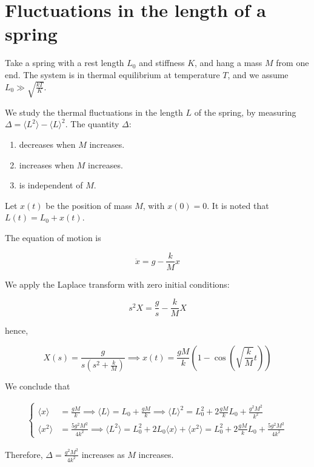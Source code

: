 \documentclass[english]{article}
\begin{document}
	\section{Fluctuations in the length of a spring}
	\begin{tcolorbox}[colback=blue!5!white,colframe=blue!75!black]
		\quad Take a spring with a rest length $L_0$ and stiffness $K$, and hang a mass $M$ from one end. The system is in thermal equilibrium at temperature $T$, and we assume $L_0 \gg \sqrt{\frac{kT}{K}}$.
		
		\quad We study the thermal fluctuations in the length $L$ of the spring, by measuring $\Delta = \langle L^2 \rangle - \langle L \rangle^2$. The quantity $\Delta$:
		\begin{enumerate}
			\item decreases when $M$ increases.
			\item increases when $M$ increases.
			\item is independent of $M$.
		\end{enumerate}
	\end{tcolorbox}

	Let \( x(t) \) be the position of mass \( M \), with \( x(0) = 0 \). It is noted that \( L(t) = L_0 + x(t) \).
	
	The equation of motion is
	
	\[ \ddot{x} = g - \frac{k}{M} x \]
	
	We apply the Laplace transform with zero initial conditions:
	
	\[ s^2 X = \frac{g}{s} - \frac{k}{M}X \]
	
	hence,
	
	$$ X(s) = \frac{g}{s \left(s^2 + \frac{k}{M}\right)} \implies x(t) = \frac{gM}{k}\left( 1 - \cos\left(\sqrt{\frac{k}{M}} t \right) \right)  $$
	
	We conclude that
	
	\begin{align}
	\begin{cases}
	\langle x \rangle &= \frac{gM}{k} \implies \langle L \rangle = L_0 + \frac{gM}{k} \implies \langle L \rangle^2 = L_0^2 + 2\frac{gM}{k}L_0 + \frac{g^2M^2}{k^2} \\
	\langle x^2 \rangle &= \frac{5g^2M^2}{4k^2} \implies \langle L^2 \rangle = L_0^2 + 2L_0\langle x \rangle + \langle x^2 \rangle = L_0^2 + 2\frac{gM}{k}L_0 + \frac{5g^2M^2}{4k^2}
	\end{cases}
	\end{align}
	
	Therefore, $\Delta = \frac{g^2M^2}{4k^2}$ increases as \( M \) increases.
	
	
\end{document}
